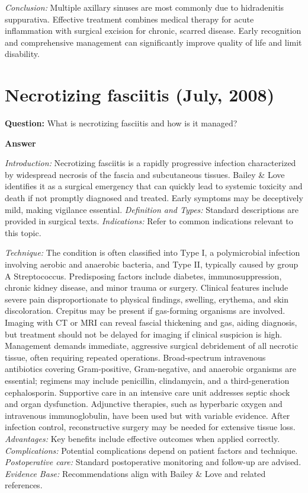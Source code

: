 \documentclass{article}
\begin{document}
\emph{Conclusion:} Multiple axillary sinuses are most commonly due to hidradenitis suppurativa. Effective treatment combines medical therapy for acute inflammation with surgical excision for chronic, scarred disease. Early recognition and comprehensive management can significantly improve quality of life and limit disability.


\section{Necrotizing fasciitis (July, 2008)}

\textbf{Question:} What is necrotizing fasciitis and how is it managed?

\textbf{Answer}

\emph{Introduction:} Necrotizing fasciitis is a rapidly progressive infection characterized by widespread necrosis of the fascia and subcutaneous tissues. Bailey \& Love identifies it as a surgical emergency that can quickly lead to systemic toxicity and death if not promptly diagnosed and treated. Early symptoms may be deceptively mild, making vigilance essential.
\emph{Definition and Types:} Standard descriptions are provided in surgical texts.
\emph{Indications:} Refer to common indications relevant to this topic.

\emph{Technique:} The condition is often classified into Type I, a polymicrobial infection involving aerobic and anaerobic bacteria, and Type II, typically caused by group A Streptococcus. Predisposing factors include diabetes, immunosuppression, chronic kidney disease, and minor trauma or surgery. Clinical features include severe pain disproportionate to physical findings, swelling, erythema, and skin discoloration. Crepitus may be present if gas-forming organisms are involved. Imaging with CT or MRI can reveal fascial thickening and gas, aiding diagnosis, but treatment should not be delayed for imaging if clinical suspicion is high. Management demands immediate, aggressive surgical debridement of all necrotic tissue, often requiring repeated operations. Broad-spectrum intravenous antibiotics covering Gram-positive, Gram-negative, and anaerobic organisms are essential; regimens may include penicillin, clindamycin, and a third-generation cephalosporin. Supportive care in an intensive care unit addresses septic shock and organ dysfunction. Adjunctive therapies, such as hyperbaric oxygen and intravenous immunoglobulin, have been used but with variable evidence. After infection control, reconstructive surgery may be needed for extensive tissue loss.
\emph{Advantages:} Key benefits include effective outcomes when applied correctly.
\emph{Complications:} Potential complications depend on patient factors and technique.
\emph{Postoperative care:} Standard postoperative monitoring and follow-up are advised.
\emph{Evidence Base:} Recommendations align with Bailey \& Love and related references.
\end{document}
